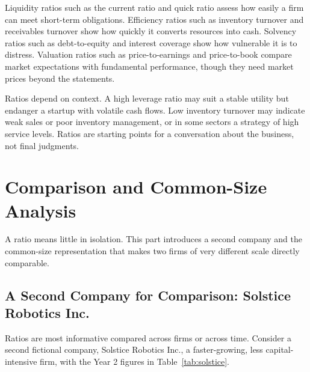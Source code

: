 \documentclass[../ai_in_finance]{subfiles}
\begin{document}
Liquidity ratios such as the current ratio and quick ratio assess how easily a firm can meet short-term obligations. Efficiency ratios such as inventory turnover and receivables turnover show how quickly it converts resources into cash. Solvency ratios such as debt-to-equity and interest coverage show how vulnerable it is to distress. Valuation ratios such as price-to-earnings and price-to-book compare market expectations with fundamental performance, though they need market prices beyond the statements.

Ratios depend on context. A high leverage ratio may suit a stable utility but endanger a startup with volatile cash flows. Low inventory turnover may indicate weak sales or poor inventory management, or in some sectors a strategy of high service levels. Ratios are starting points for a conversation about the business, not final judgments.

\section{Comparison and Common-Size Analysis}

A ratio means little in isolation. This part introduces a second company and the common-size representation that makes two firms of very different scale directly comparable.

\subsection{A Second Company for Comparison: Solstice Robotics Inc.}
\label{sec:solstice}

Ratios are most informative compared across firms or across time. Consider a second fictional company, Solstice Robotics Inc., a faster-growing, less capital-intensive firm, with the Year 2 figures in Table~\ref{tab:solstice}.
\end{document}
